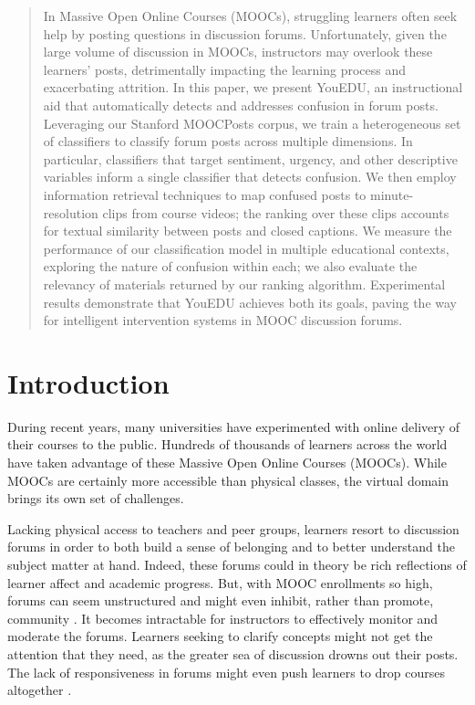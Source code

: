 \documentclass{edm_template}
\begin{document}
\maketitle
\begin{abstract}
In Massive Open Online Courses (MOOCs), struggling learners often seek help by
posting questions in discussion forums. Unfortunately, given the large volume of discussion in MOOCs, instructors may overlook these learners' posts,
detrimentally impacting the learning process and exacerbating attrition. In this paper, we present YouEDU, an instructional aid that automatically detects and addresses confusion in forum posts. Leveraging our Stanford MOOCPosts corpus, we train a heterogeneous set of classifiers to classify forum posts across multiple dimensions. In particular, classifiers that target sentiment, urgency, and other descriptive variables inform a single classifier that detects confusion. We then employ information retrieval techniques to map confused posts to minute-resolution clips from course videos; the ranking over these clips accounts for textual similarity between posts and closed captions. We measure the performance of our classification model in multiple educational contexts, exploring the nature of confusion within each; we also evaluate the relevancy of materials returned by our ranking algorithm. Experimental results demonstrate that YouEDU achieves both its goals, paving the way for intelligent intervention systems in MOOC discussion forums.
\end{abstract}

%

\section{Introduction}
\label{sec:intro}

During recent years, many universities have experimented with online delivery of their courses to the public. Hundreds of thousands of learners across the world have taken advantage of these Massive Open Online Courses (MOOCs). While MOOCs are certainly more accessible than physical classes, the virtual domain brings its own set of challenges.

Lacking physical access to teachers and peer groups, learners resort to discussion forums in order to both build a sense of belonging and to better understand the subject matter at hand. Indeed, these forums could in theory be rich reflections of learner affect and academic progress. But, with MOOC enrollments so high, forums can seem unstructured and might even inhibit, rather than promote, community \cite{community}. It becomes intractable for instructors to effectively monitor and moderate the forums. Learners seeking to clarify concepts might not get the attention that they need, as the greater sea of discussion drowns out their posts. The lack of responsiveness in forums might even push learners to drop courses altogether \cite{wen2015confusion}.
\end{document}
